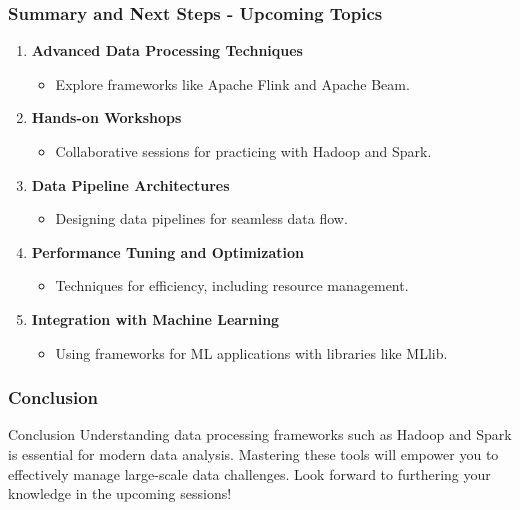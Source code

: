 \documentclass{beamer}
\begin{document}
\begin{frame}[fragile]
    \frametitle{Summary and Next Steps - Upcoming Topics}
    \begin{enumerate}
        \item \textbf{Advanced Data Processing Techniques}
        \begin{itemize}
            \item Explore frameworks like Apache Flink and Apache Beam.
        \end{itemize}

        \item \textbf{Hands-on Workshops}
        \begin{itemize}
            \item Collaborative sessions for practicing with Hadoop and Spark.
        \end{itemize}

        \item \textbf{Data Pipeline Architectures}
        \begin{itemize}
            \item Designing data pipelines for seamless data flow.
        \end{itemize}

        \item \textbf{Performance Tuning and Optimization}
        \begin{itemize}
            \item Techniques for efficiency, including resource management.
        \end{itemize}

        \item \textbf{Integration with Machine Learning}
        \begin{itemize}
            \item Using frameworks for ML applications with libraries like MLlib.
        \end{itemize}
    \end{enumerate}
\end{frame}

\begin{frame}[fragile]
    \frametitle{Conclusion}
    \begin{block}{Conclusion}
    Understanding data processing frameworks such as Hadoop and Spark is essential for modern data analysis. Mastering these tools will empower you to effectively manage large-scale data challenges. Look forward to furthering your knowledge in the upcoming sessions!
    \end{block}
\end{frame}
\end{document}
